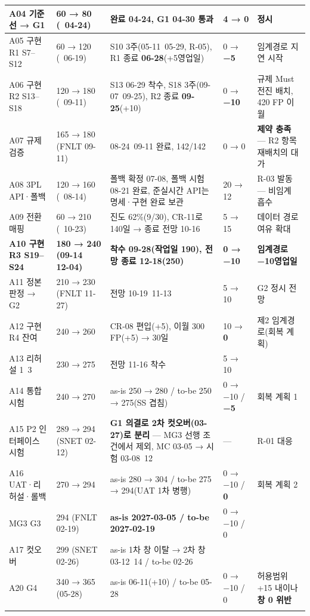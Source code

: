 \documentclass[10pt,a4paper]{article}
\begin{document}
{\begin{longtable}{|L{36mm}|L{40mm}|L{78mm}|L{40mm}|L{62mm}|}
A04 기준선 → G1 & 60 → 80 (~04-24) & 완료 04-24, G1 04-30 통과 & 4 → 0 & 정시 \\ \hline
A05 구현 R1 S7–S12 & 60 → 120 (~06-19) & S10 3주(05-11~05-29, R-05), R1 종료 \textbf{06-28}(+5영업일) & 0 → \textbf{−5} & 임계경로 지연 시작 \\ \hline
A06 구현 R2 S13–S18 & 120 → 180 (~09-11) & S13 06-29 착수, S18 3주(09-07~09-25), R2 종료 \textbf{09-25}(+10) & 0 → \textbf{−10} & 규제 Must 전진 배치, 420 FP 이월 \\ \hline
A07 규제 검증 & 165 → 180 (FNLT 09-11) & 08-24~09-11 완료, 142/142 & 0 → 0 & \textbf{제약 충족} — R2 항목 재배치의 대가 \\ \hline
A08 3PL API·폴백 & 120 → 160 (~08-14) & 폴백 확정 07-08, 폴백 시험 08-21 완료, 준실시간 API는 명세·구현 완료 보관 & 20 → 12 & R-03 발동 — 비임계 흡수 \\ \hline
A09 전환 매핑 & 60 → 210 (~10-23) & 진도 62\%(9/30), CR-11로 140일 → 종료 전망 10-16 & 5 → 15 & 데이터 경로 여유 확대 \\ \hline
\textbf{A10 구현 R3 S19–S24} & \textbf{180 → 240 (09-14 ~ 12-04)} & \textbf{착수 09-28(작업일 190), 전망 종료 12-18(250)} & \textbf{0 → −10} & \textbf{임계경로 −10영업일} \\ \hline
A11 정본 판정 → G2 & 210 → 230 (FNLT 11-27) & 전망 10-19~11-13 & 5 → 10 & G2 정시 전망 \\ \hline
A12 구현 R4 잔여 & 240 → 260 & CR-08 편입(+5), 이월 300 FP(+5) → 30일 & 10 → \textbf{0} & 제2 임계경로(회복 계획) \\ \hline
A13 리허설 1~3 & 230 → 275 & 전망 11-16 착수 & 5 → 10 & \\ \hline
A14 통합시험 & 240 → 270 & as-is 250 → 280 / to-be 250 → 275(SS 겹침) & 0 → −10 / \textbf{−5} & 회복 계획 1 \\ \hline
A15 P2 인터페이스 시험 & 289 → 294 (SNET 02-12) & \textbf{G1 의결로 2차 컷오버(03-27)로 분리} — MG3 선행 조건에서 제외, MC 03-05 → 시험 03-08~12 & — & R-01 대응 \\ \hline
A16 UAT·리허설·롤백 & 270 → 294 & as-is 280 → 304 / to-be 275 → 294(UAT 1차 병행) & 0 → −10 / \textbf{0} & 회복 계획 2 \\ \hline
MG3 G3 & 294 (FNLT 02-19) & \textbf{as-is 2027-03-05 / to-be 2027-02-19} & 0 → −10 / 0 & \\ \hline
A17 컷오버 & 299 (SNET 02-26) & as-is 1차 창 이탈 → 2차 창 03-12~14 / to-be 02-26 & & \\ \hline
A20 G4 & 340 → 365 (05-28) & as-is 06-11(+10) / to-be 05-28 & 0 → −10 / 0 & 허용범위 +15 내이나 \textbf{창 0 위반} \\ \hline
\fi
\end{longtable}}
\end{document}
